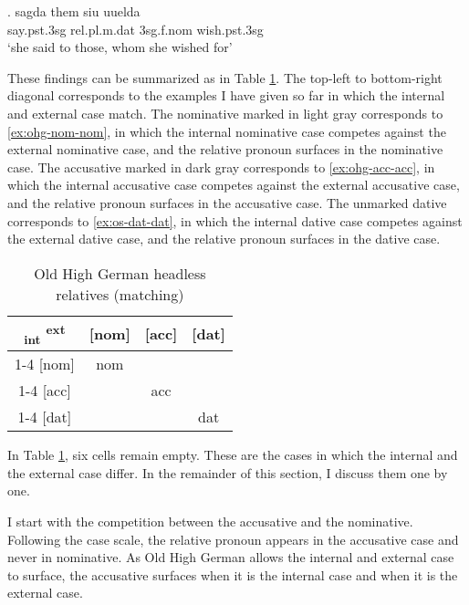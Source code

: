 \exg. sagda them siu uuelda\\
 say.\ac{pst}.3\ac{sg}\scsub{[dat]} \ac{rel}.\ac{pl}.\ac{m}.\ac{dat} 3\ac{sg}.\ac{f}.\ac{nom} wish.\ac{pst}.3\ac{sg}\scsub{[dat]}\\
 `she said to those, whom she wished for' \label{ex:os-dat-dat}

These findings can be summarized as in Table \ref{tbl:summary-ohg-matching}. The top-left to bottom-right diagonal corresponds to the examples I have given so far in which the internal and external case match. The nominative marked in light gray corresponds to \ref{ex:ohg-nom-nom}, in which the internal nominative case competes against the external nominative case, and the relative pronoun surfaces in the nominative case. The accusative marked in dark gray corresponds to \ref{ex:ohg-acc-acc}, in which the internal accusative case competes against the external accusative case, and the relative pronoun surfaces in the accusative case. The unmarked dative corresponds to \ref{ex:os-dat-dat}, in which the internal dative case competes against the external dative case, and the relative pronoun surfaces in the dative case.

\begin{table}[H]
  \center
  \caption{Old High German headless relatives (matching)}
  \begin{tabular}{c|c|c|c}
    \toprule
     \textsubscript{\ac{int}} \textsuperscript{\ac{ext}}
          & [\ac{nom}]
          & [\ac{acc}]
          & [\ac{dat}]
          \\ \cmidrule{1-4}
      [\ac{nom}]
          & \colorbox{LG}{\ac{nom}}
          &
          &
          \\ \cmidrule{1-4}
      [\ac{acc}]
          &
          & \colorbox{DG}{\ac{acc}}
          &
          \\ \cmidrule{1-4}
      [\ac{dat}]
          &
          &
          & \ac{dat}
          \\
    \bottomrule
  \end{tabular}
    \label{tbl:summary-ohg-matching}
\end{table}

In Table \ref{tbl:summary-ohg-matching}, six cells remain empty. These are the cases in which the internal and the external case differ. In the remainder of this section, I discuss them one by one.

I start with the competition between the accusative and the nominative. Following the case scale, the relative pronoun appears in the accusative case and never in nominative. As Old High German allows the internal and external case to surface, the accusative surfaces when it is the internal case and when it is the external case.

